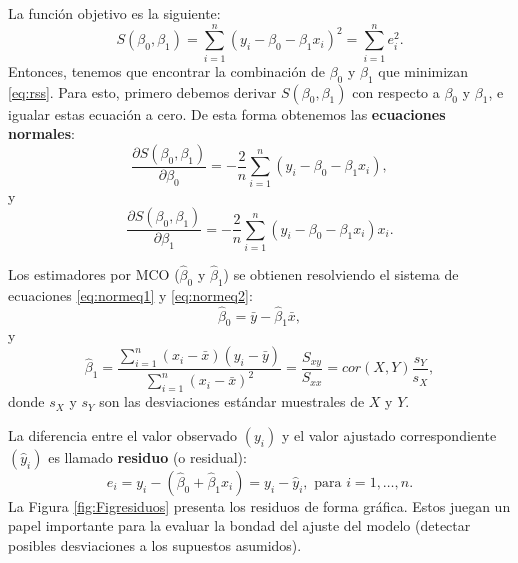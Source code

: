 \documentclass[
]{article}
\begin{document}
La función objetivo es la siguiente:
\begin{equation}
S(\beta_{0},\beta_{1}) = \sum_{i=1}^{n} \left( y_{i} - \beta_{0} - \beta_{1}x_{i} \right)^{2} = \sum_{i=1}^{n} e_{i}^{2}.
 \label{eq:rss}
\end{equation}
Entonces, tenemos que encontrar la combinación de \(\beta_{0}\) y \(\beta_{1}\) que minimizan \eqref{eq:rss}. Para esto, primero debemos derivar \(S(\beta_{0},\beta_{1})\) con respecto a \(\beta_{0}\) y \(\beta_{1}\), e igualar estas ecuación a cero. De esta forma obtenemos las \textbf{ecuaciones normales}:
\begin{equation}
\frac{\partial S(\beta_{0},\beta_{1})}{\partial \beta_{0}} = - \frac{2}{n}\sum_{i=1}^{n}\left(y_{i}-\beta_{0}-\beta_{1}x_{i} \right),
\label{eq:normeq1}
\end{equation}
y
\begin{equation}
\frac{\partial S(\beta_{0},\beta_{1})}{\partial \beta_{1}} = - \frac{2}{n}\sum_{i=1}^{n}\left(y_{i}-\beta_{0}-\beta_{1}x_{i} \right)x_{i}.
\label{eq:normeq2}
\end{equation}

Los estimadores por MCO (\(\widehat{\beta}_{0}\) y \(\widehat{\beta}_{1}\)) se obtienen resolviendo el sistema de ecuaciones \eqref{eq:normeq1} y \eqref{eq:normeq2}:
\[
\widehat{\beta}_{0} = \bar{y} - \widehat{\beta}_{1}\bar{x},
\]
y
\[
\widehat{\beta}_{1} = \frac{\sum_{i=1}^{n}(x_{i}-\bar{x})(y_{i}-\bar{y})}{\sum_{i=1}^{n}(x_{i}-\bar{x})^2} = \frac{S_{xy}}{S_{xx}} =  cor(X,Y)\frac{s_{Y}}{s_{X}},
\]
donde \(s_{X}\) y \(s_{Y}\) son las desviaciones estándar muestrales de \(X\) y \(Y\).

La diferencia entre el valor observado \((y_{i})\) y el valor ajustado correspondiente \((\widehat{y}_{i})\) es llamado \textbf{residuo} (o residual):
\[
e_{i}= y_{i} - (\widehat{\beta}_{0} + \widehat{\beta}_{1}x_{i}) = y_{i}-\widehat{y}_{i}, \mbox{ para }i=1,\ldots,n.
\]
La Figura \ref{fig:Figresiduos} presenta los residuos de forma gráfica. Estos juegan un papel importante para la evaluar la bondad del ajuste del modelo (detectar posibles desviaciones a los supuestos asumidos).
\end{document}
